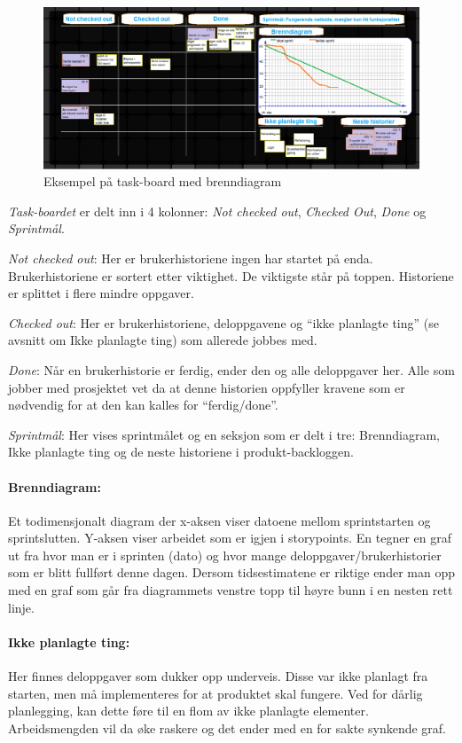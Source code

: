 \documentclass[12pt,a4paper,norsk]{article}
\begin{document}
    \begin{figure}[h!]
    \includegraphics[width=\linewidth]{img/task-board.png}
      \caption{Eksempel på task-board med brenndiagram}
      \label{fig:task-board}
  \end{figure}

    \textit{Task-boardet} er delt inn i 4 kolonner: \textit{Not checked out}, \textit{Checked Out}, \textit{Done} og \textit{Sprintmål}.

    \textit{Not checked out}: Her er brukerhistoriene ingen har startet på enda. Brukerhistoriene er sortert etter viktighet. De viktigste står på toppen. Historiene er splittet i flere mindre oppgaver.

    \textit{Checked out}: Her er brukerhistoriene, deloppgavene og “ikke planlagte ting” (se avsnitt om Ikke planlagte ting) som allerede jobbes med.

    \textit{Done}: Når en brukerhistorie er ferdig, ender den og alle deloppgaver her. Alle som jobber med prosjektet vet da at denne historien oppfyller kravene som er nødvendig for at den kan kalles for “ferdig/done”.

    \textit{Sprintmål}: Her vises sprintmålet og en seksjon som er delt i tre: Brenndiagram, Ikke planlagte ting og de neste historiene i produkt-backloggen.

    \paragraph{Brenndiagram:}
    Et todimensjonalt diagram der x-aksen viser datoene mellom sprintstarten og sprintslutten. Y-aksen viser arbeidet som er igjen i storypoints. En tegner en graf ut fra hvor man er i sprinten (dato) og hvor mange deloppgaver/brukerhistorier som er blitt fullført denne dagen. Dersom tidsestimatene er riktige ender man opp med en graf som går fra diagrammets venstre topp til høyre bunn i en nesten rett linje.

    \paragraph{Ikke planlagte ting:}
    Her finnes deloppgaver som dukker opp underveis. Disse var ikke planlagt fra starten, men må implementeres for at produktet skal fungere. Ved for dårlig planlegging, kan dette føre til en flom av ikke planlagte elementer. Arbeidsmengden vil da øke raskere og det ender med en for sakte synkende graf.
\end{document}
